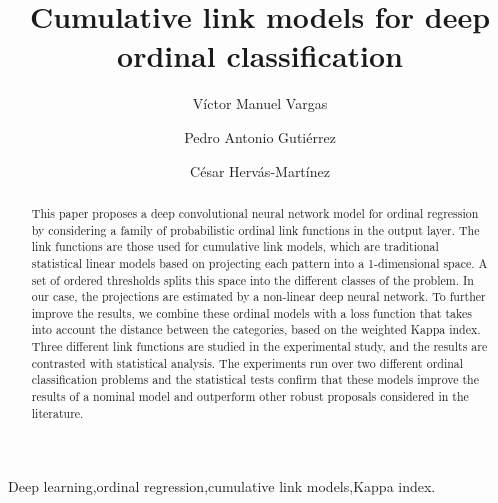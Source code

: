 \documentclass[preprint]{elsarticle}
\begin{document}
\begin{frontmatter}

\title{Cumulative link models for deep ordinal classification}

\author{V\'ictor Manuel Vargas}
\author{Pedro Antonio Guti\'errez}
\author{C\'esar Herv\'as-Mart\'inez}
\address{Department of Computer Science and Numerical Analysis, University of C\'ordoba, C\'ordoba, Spain}

\begin{abstract}
	This paper proposes a deep convolutional neural network model for ordinal regression by considering a family of probabilistic ordinal link functions in the output layer. The link functions are those used for cumulative link models, which are traditional statistical linear models based on projecting each pattern into a 1-dimensional space. A set of ordered thresholds splits this space into the different classes of the problem. In our case, the projections are estimated by a non-linear deep neural network. To further improve the results, we combine these ordinal models with a loss function that takes into account the distance between the categories, based on the weighted Kappa index. Three different link functions are studied in the experimental study, and the results are contrasted with statistical analysis. The experiments run over two different ordinal classification problems and the statistical tests confirm that these models improve the results of a nominal model and outperform other robust proposals considered in the literature.
\end{abstract}

\begin{keyword}
Deep learning\sep ordinal regression\sep cumulative link models\sep Kappa index.
\end{keyword}

\end{frontmatter}

\end{document}
